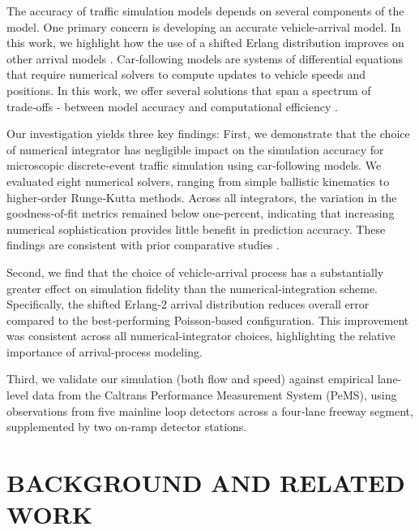 \documentclass{scspaperproc}
\theoremstyle{scsthe}
\begin{document}
The accuracy of traffic simulation models depends on several components of the model.
One primary concern is developing an accurate vehicle‑arrival model. In this work, we highlight how the use of a shifted Erlang distribution improves on other arrival models \cite{cowan1975useful, li2017vehicle}.
Car‑following models are systems of differential equations that require numerical solvers to compute updates to vehicle speeds and positions. In this work, we offer several solutions that span a spectrum of trade‑offs - between model accuracy and computational efficiency \cite{treiber2015comparing, pvrikryl2017comparing}.

Our investigation yields three key findings:
First, we demonstrate that the choice of numerical integrator has negligible impact on the simulation accuracy for microscopic discrete‑event traffic simulation using car‑following models. We evaluated eight numerical solvers, ranging from simple ballistic kinematics to higher‑order Runge‑Kutta methods. Across all integrators, the variation in the goodness‑of‑fit metrics remained below one-percent, indicating that increasing numerical sophistication provides little benefit in prediction accuracy. These findings are consistent with prior comparative studies \cite{treiber2015comparing, pvrikryl2017comparing}.

Second, we find that the choice of vehicle‑arrival process has a substantially greater effect on simulation fidelity 
than the numerical‑integration scheme. Specifically, the shifted Erlang‑2 arrival distribution reduces overall error compared to the best‑performing Poisson‑based configuration. This improvement was consistent across all numerical‑integrator choices, highlighting the relative importance of arrival‑process modeling.

Third, we validate our simulation (both flow and speed) against empirical lane-level data from the Caltrans Performance Measurement System (PeMS), using observations from five mainline loop detectors across a four‑lane freeway segment, supplemented by two on‑ramp detector stations.

\section{BACKGROUND AND RELATED WORK}
\label{sec:related}
\end{document}
